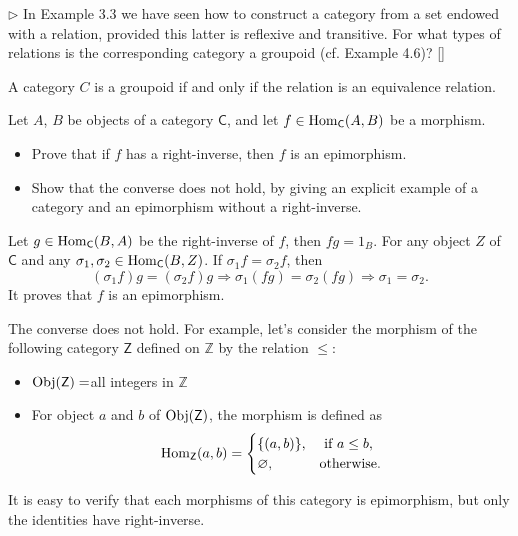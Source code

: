 \begin{problem}[4.2]
 $\rhd$ In Example 3.3 we have seen how to construct a category from a set endowed  with a relation, provided this latter is reflexive and transitive. For what types of relations is the corresponding category a groupoid (cf. Example 4.6)? []
\end{problem}

\begin{solution}
A category $C$ is a groupoid if and only if the relation is an equivalence relation.
\end{solution}

\begin{problem}[4.3]
  \def \C {\mathsf{C}}
  Let $A$, $B$ be objects of a category $\mathsf{C}$, and let $f \in \mathrm{Hom}_\mathsf{C}(A, B)$ be a
  morphism.
  \begin{itemize}
    \item Prove that if $f$ has a right-inverse, then $f$ is an epimorphism.
    \item Show that the converse does not hold, by giving an explicit example of a
    category and an epimorphism without a right-inverse.
  \end{itemize}
\end{problem}

\begin{solution}
Let $g\in \mathrm{Hom}_\mathsf{C}(B, A)$ be the right-inverse of $f$, then $fg=1_B$. For any object $Z$ of $\mathsf{C}$ and 
any $\sigma_1, \sigma_2\in \mathrm{Hom}_\mathsf{C}(B, Z)$. If $\sigma_1f=\sigma_2f$, then
$$(\sigma_1f)g=(\sigma_2f)g\Longrightarrow \sigma_1(fg)=\sigma_2(fg)\Longrightarrow \sigma_1=\sigma_2.$$
It proves that $f$ is an epimorphism.

The converse does not hold. For example, let's consider the morphism of the following category $\mathsf{Z}$ defined on $\mathbb{Z}$ 
by the relation $\leq$:
\begin{itemize}
    \item $\mathrm{Obj}(\mathsf{Z})=$all integers in $\mathbb{Z}$
    \item For object $a$ and $b$ of $\mathrm{Obj}(\mathsf{Z})$, the morphism is defined as
    $$\mathrm{Hom}_{\mathsf{Z}}(a,b) = 
    \begin{cases}
    \{(a,b)\},&\text{ if } a\leq b,\\
    \varnothing, &\text{otherwise}.
    \end{cases}$$
\end{itemize}
It is easy to verify that each morphisms of this category is epimorphism, but only the identities have right-inverse.
\end{solution}


